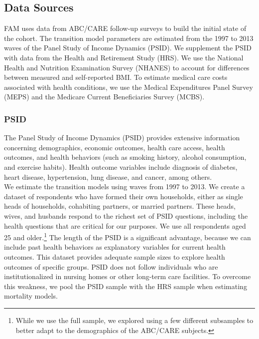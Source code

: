 \subsection{Data Sources} \label{section:data}
\noindent FAM uses data from ABC/CARE follow-up surveys to build the initial state of the cohort. 
The transition model parameters are estimated from the 1997 to 2013 waves of the Panel Study of Income Dynamics (PSID). 
We supplement the PSID with data from the Health and Retirement Study (HRS). We use the National Health and Nutrition Examination Survey (NHANES) 
to account for differences between measured and self-reported BMI.
To estimate medical care costs associated with health conditions, we use the Medical Expenditures Panel Survey (MEPS) and the Medicare Current Beneficiaries Survey (MCBS). \\


\subsubsection{PSID}
\label{section:data_psid}

\noindent The Panel Study  of Income Dynamics (PSID) provides extensive information concerning demographics, economic outcomes, health care access, health outcomes, and health behaviors (such as smoking history, alcohol consumption, and exercise habits). Health outcome variables include diagnosis of diabetes, heart disease, hypertension, lung disease, and cancer, among others.\\

\noindent We estimate the transition models using waves from 1997 to 2013. We create a dataset of respondents who have formed their own households, either
as single heads of households, cohabiting partners, or married partners.  These heads, wives, and husbands respond to the richest
set of PSID questions, including the health questions that are critical for our purposes. We use all respondents aged 25 and older.\footnote{While we use the full sample, we explored using a few different subsamples to better adapt to the demographics of the ABC/CARE subjects.}  
The length of the PSID is a significant advantage, because we can include past health behaviors as explanatory variables for current health outcomes. This dataset provides adequate sample sizes to explore health outcomes of specific groups. 
PSID does not follow individuals who are institutionalized in nursing homes or other long-term care facilities. To overcome this weakness, we pool the PSID sample with the HRS sample when
estimating mortality models. \\

